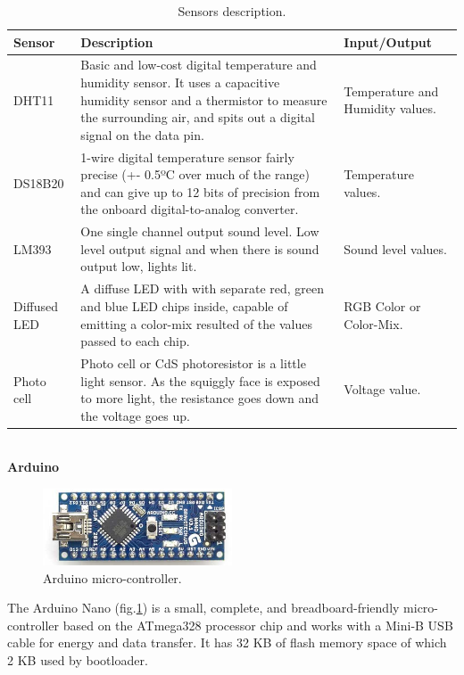 \documentclass[12pt]{report}
\begin{document}
\begin{table}[H]
\begin{tabularx}{0.85\textwidth}{ |l|X|p{3cm}| }
  	\hline
  	\textbf{Sensor}  & \textbf{Description} & \textbf{Input/Output} \\
 	\hline
 	DHT11  & Basic and low-cost digital temperature and humidity sensor. It uses a capacitive humidity sensor and a thermistor to measure the surrounding air, and spits out a digital signal on the data pin. & Temperature and Humidity values. \\
 	\hline
 	DS18B20  & 1-wire digital temperature sensor fairly precise (+- 0.5ºC over much of the range) and can give up to 12 bits of precision from the onboard digital-to-analog converter. & Temperature values. \\
 	\hline
 	LM393 & One single channel output sound level. Low level output signal and when there is sound output low, lights lit. & Sound level values. \\
 	\hline
 	Diffused LED & A diffuse LED with with separate red, green and blue LED chips inside, capable of emitting a color-mix resulted of the values passed to each chip. & RGB Color or Color-Mix.\\
 	\hline
 	Photo cell & Photo cell or CdS photoresistor is a little light sensor. As the squiggly face is exposed to more light, the resistance goes down and the voltage goes up. & Voltage value.\\
 	\hline
\end{tabularx}
	\caption{Sensors description.}
  	\label{tab:prolangs}
\end{table}

\textbf{\\Arduino}

\begin{figure}[H]
    \centering
    \includegraphics[width=0.5\textwidth]{img/arduino.png}
    \caption{Arduino micro-controller.}
    \label{fig:arduino}
\end{figure}

The Arduino Nano (fig.\ref{fig:arduino}) is a small, complete, and breadboard-friendly micro-controller based on the ATmega328 processor chip and works with a Mini-B USB cable for energy and data transfer. It has 32 KB of flash memory space of which 2 KB used by bootloader.
\end{document}
